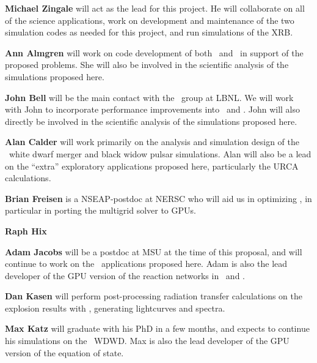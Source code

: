 \documentclass[11pt,letterpaper,english]{article}
\begin{document}
\begin{tightitem}
\item {\bf Michael Zingale} will act as the lead for this project.  He
  will collaborate on all of the science applications, work on
  development and maintenance of the two simulation codes as needed
  for this project, and run simulations of the XRB.

\item {\bf Ann Almgren} will work on code development of both \maestro\
  and \castro\ in support of the proposed problems.  She will also be
  involved in the scientific analysis of the simulations proposed here.

\item {\bf John Bell} will be the main contact with the \boxlib\ group
  at LBNL.  We will work with John to incorporate performance
  improvements into \maestro\ and \castro.  John will also directly be
  involved in the scientific analysis of the simulations proposed
  here.

\item {\bf Alan Calder} will work primarily on the analysis and
  simulation design of the \castro\ white dwarf merger and
  black widow pulsar simulations.
  Alan will also be a lead on the ``extra'' exploratory applications
  proposed here, particularly the URCA calculations.

\item {\bf Brian Freisen} is a NSEAP-postdoc at NERSC who will aid us
  in optimizing \boxlib, in particular in porting the multigrid solver
  to GPUs.

\item {\bf Raph Hix}

\item {\bf Adam Jacobs} will be a postdoc at MSU at the time of this
  proposal, and will continue to work on the \maestro\ applications
  proposed here.  Adam is also the lead developer of the GPU version
  of the reaction networks in \maestro\ and \castro.

\item {\bf Dan Kasen} will perform post-processing radiation transfer
  calculations on the explosion results with \sedona, generating
  lightcurves and spectra.

\item {\bf Max Katz} will graduate with his PhD in a few months, and
  expects to continue his simulations on the \castro\ WDWD.  Max is
  also the lead developer of the GPU version of the equation of state.


\end{tightitem}
\end{document}
